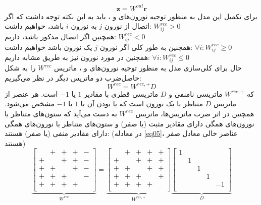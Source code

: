 \documentclass[a4paper]{article}
\begin{document}
		\begin{equation}
\mathbf{z} = W^{out}\mathbf{r}
\label{eq03}
\end{equation}
برای تکمیل این مدل به منظور توجیه نورون‌های  و ، باید به این نکته توجه داشت که اگر اتصال از نورون $j$ به نورون $i$ 
باشد، خواهیم داشت: 
$W^{rec}_{ij}>0$\\
همچنین اگر اتصال مذکور  باشد، داریم: 
$W^{rec}_{ij}<0$\\
همچنین به طور کلی اگر نورون $j$ یک نورون  باشد خواهیم داشت: 
$\forall i : W^{rec}_{ij}\geq0$\\
همچنین در مورد نورون  نیز به طریق مشابه داریم:
$\forall i : W^{rec}_{ij}\leq0$\\

حال برای کلی‌سازی مدل به منظور توجیه نورون‌های  و ، ماتریس 
$W^{rec}$
را به شکل حاصل‌ضرب دو ماتریس دیگر در نظر می‌گیریم:
		\begin{equation}
W^{rec}=W^{rec,+}D
\label{eq04}
\end{equation}
که 
$W^{rec,+}$
ماتریسی نامنفی و $D$ ماتریسی قطری با مقادیر $1$ یا $-1$ است. هر عنصر از ماتریس ‌$D$ متناظر با یک نورون است که  یا  بودن آن با $1$ یا $-1$ مشخص می‌شود. همچنین در اثر ضرب ماتریس‌ها، ماتریس 
$W^{rec}$ 
به دست می‌آید که ستون‌های متناظر با نورون‌های  همگی دارای مقادیر مثبت (یا صفر) و ستون‌های متناظر با نورون‌های  همگی دارای مقادیر منفی (یا صفر) هستند: (در معادله \ref{eq05}، عناصر خالی معادل صفر هستند)
		\begin{equation}
\underbrace{\begin{bmatrix}
 & + & + & + & -\\
+  &  & + & + & -\\
 +  & + &  & + & -\\
  +  & + & + &  & -\\
   +  & + & + & + & \\
\end{bmatrix}
}_{W^{rec}}
=
\underbrace{\begin{bmatrix}
& + & + & + & +\\
+  &  & + & + & +\\
+  & + &  & + & +\\
+  & + & + &  & +\\
+  & + & + & + & \\
\end{bmatrix}
}_{W^{rec,+}}
\underbrace{\begin{bmatrix}
1&&&&\\
&1&&&\\
&&1&&\\
&&&1&\\
&&&&-1\\
\end{bmatrix}
}_{D}
\label{eq05}
\end{equation}
\end{document}
